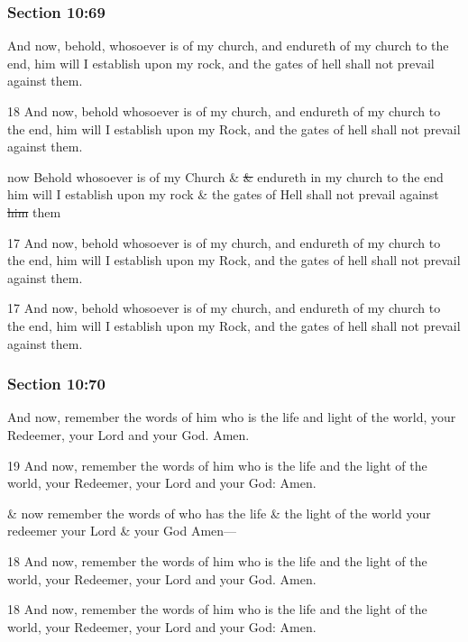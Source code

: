 	\subsubsection{Section 10:69} %
		\label{DC10-69}

		And now, behold, whosoever is of my church, and endureth of my church to the end, him will I establish upon my rock, and the gates of hell shall not prevail against them.

		\begin{framed}
		\scriptsize
			\begin{compactdesc}
				\item[JSP] 18 And now, behold whosoever is of my church, and endureth of my church to the end, him will I establish upon my Rock, and the gates of hell shall not prevail against them.
				\item[RB1] now Behold whosoever is of my Church \& \sout{\&} endureth in my church to the end him will I establish upon my rock \& the gates of Hell shall not prevail against \sout{him} them
				\item[DC 1835] 17 And now, behold whosoever is of my church, and endureth of my church to the end, him will I establish upon my Rock, and the gates of hell shall not prevail against them.
				\item[DC 1844] 17 And now, behold whosoever is of my church, and endureth of my church to the end, him will I establish upon my Rock, and the gates of hell shall not prevail against them.
			\end{compactdesc}
		\end{framed}

	\subsubsection{Section 10:70} %
		\label{DC10-70}

		And now, remember the words of him who is the life and light of the world, your Redeemer, your Lord and your God.  Amen.

		\begin{framed}
		\scriptsize
			\begin{compactdesc}
				\item[JSP] 19 And now, remember the words of him who is the life and the light of the world, your Redeemer, your Lord and your God: Amen.
				\item[RB1] \& now remember the words of who has the life \& the light of the world your redeemer your Lord \& your God Amen---
				\item[DC 1835] 18 And now, remember the words of him who is the life and the light of the world, your Redeemer, your Lord and your God. Amen.
				\item[DC 1844] 18 And now, remember the words of him who is the life and the light of the world, your Redeemer, your Lord and your God: Amen.
			\end{compactdesc}
		\end{framed}